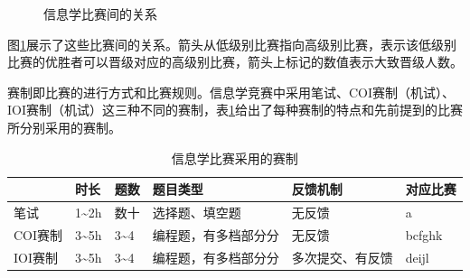         \begin{figure}
            \centering
            \caption{信息学比赛间的关系}
            \label{fig:contests}
        \end{figure}

        图\ref{fig:contests}展示了这些比赛间的关系。箭头从低级别比赛指向高级别比赛，表示该低级别比赛的优胜者可以晋级对应的高级别比赛，箭头上标记的数值表示大致晋级人数。

        \vspace{1.5ex}

        赛制即比赛的进行方式和比赛规则。信息学竞赛中采用笔试、COI赛制（机试）、IOI赛制（机试）这三种不同的赛制，表\ref{tab:formats}给出了每种赛制的特点和先前提到的比赛所分别采用的赛制。

        \begin{table}\footnotesize
            \centering
            \begin{tabular}{@{}llllll@{}}
                \toprule
                    & 时长                  & 题数                 & 题目类型       & 反馈机制       & 对应比赛   \\ \midrule
                笔试  & 1\textasciitilde 2h & 数十                 & 选择题、填空题     & 无反馈        & a      \\
                COI赛制 & 3\textasciitilde 5h & 3\textasciitilde 4 & 编程题，有多档部分分 & 无反馈        & bcfghk \\
                IOI赛制 & 3\textasciitilde 5h & 3\textasciitilde 4 & 编程题，有多档部分分 & 多次提交、有反馈 & deijl  \\ \bottomrule
            \end{tabular}
            \caption{信息学比赛采用的赛制}
            \label{tab:formats}
        \end{table}

